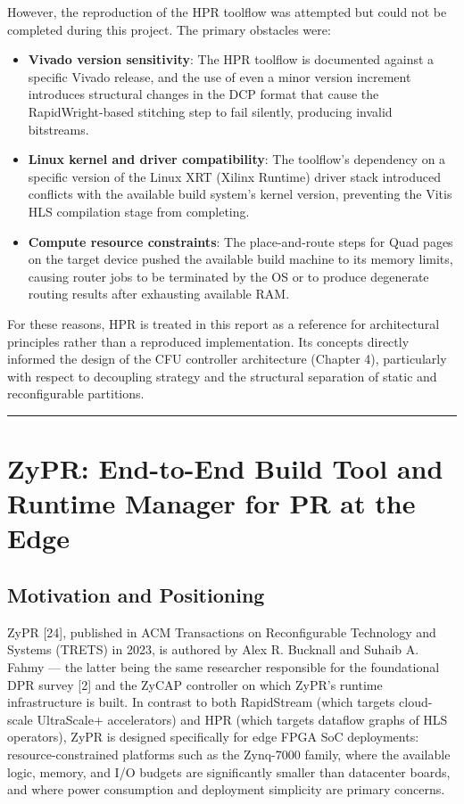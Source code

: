 However, the reproduction of the HPR toolflow was attempted but could not be completed during this project. The primary obstacles were:

\begin{itemize}
  \item \textbf{Vivado version sensitivity}: The HPR toolflow is documented against a specific Vivado release, and the use of even a minor version increment introduces structural changes in the DCP format that cause the RapidWright-based stitching step to fail silently, producing invalid bitstreams.
  \item \textbf{Linux kernel and driver compatibility}: The toolflow's dependency on a specific version of the Linux XRT (Xilinx Runtime) driver stack introduced conflicts with the available build system's kernel version, preventing the Vitis HLS compilation stage from completing.
  \item \textbf{Compute resource constraints}: The place-and-route steps for Quad pages on the target device pushed the available build machine to its memory limits, causing router jobs to be terminated by the OS or to produce degenerate routing results after exhausting available RAM.
\end{itemize}
For these reasons, HPR is treated in this report as a reference for architectural principles rather than a reproduced implementation. Its concepts directly informed the design of the CFU controller architecture (Chapter 4), particularly with respect to decoupling strategy and the structural separation of static and reconfigurable partitions.

\vspace{0.4em}\hrule\vspace{0.4em}

\section{ZyPR: End-to-End Build Tool and Runtime Manager for PR at the Edge}

\subsection{Motivation and Positioning}

ZyPR [24], published in ACM Transactions on Reconfigurable Technology and Systems (TRETS) in 2023, is authored by Alex R. Bucknall and Suhaib A. Fahmy — the latter being the same researcher responsible for the foundational DPR survey [2] and the ZyCAP controller on which ZyPR's runtime infrastructure is built. In contrast to both RapidStream (which targets cloud-scale UltraScale+ accelerators) and HPR (which targets dataflow graphs of HLS operators), ZyPR is designed specifically for edge FPGA SoC deployments: resource-constrained platforms such as the Zynq-7000 family, where the available logic, memory, and I/O budgets are significantly smaller than datacenter boards, and where power consumption and deployment simplicity are primary concerns.

